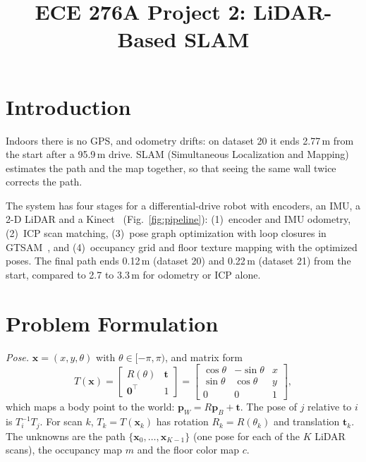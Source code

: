 \documentclass[letterpaper, 10pt, conference]{ieeeconf}
\newcommand{\p}{\mathbf{p}}
\newcommand{\tb}{\mathbf{t}}
\newcommand{\x}{\mathbf{x}}
\begin{document}
\title{ECE 276A Project 2: LiDAR-Based SLAM}

\author{
}

\maketitle
\thispagestyle{empty}
\pagestyle{empty}

\section{Introduction}

Indoors there is no GPS, and odometry drifts: on dataset 20 it ends 2.77\,m
from the start after a 95.9\,m drive. SLAM (Simultaneous Localization and
Mapping) estimates the path and the map together, so that seeing the same
wall twice corrects the path.

The system has four stages for a differential-drive robot with encoders, an
IMU, a 2-D LiDAR and a Kinect~\cite{atanasov} (Fig.~\ref{fig:pipeline}):
(1)~encoder and IMU odometry, (2)~ICP scan matching, (3)~pose graph
optimization with loop closures in GTSAM~\cite{gtsam}, and (4)~occupancy grid
and floor texture mapping with the optimized poses. The final path ends
0.12\,m (dataset 20) and 0.22\,m (dataset 21) from the start, compared to 2.7
to 3.3\,m for odometry or ICP alone.

\section{Problem Formulation}

\emph{Pose.} $\x=(x,y,\theta)$ with $\theta\in[-\pi,\pi)$, and matrix form
\begin{equation}
T(\x)=\begin{bmatrix}R(\theta) & \tb\\ \mathbf{0}^\top & 1\end{bmatrix}
=\begin{bmatrix}\cos\theta & -\sin\theta & x\\ \sin\theta & \cos\theta & y\\ 0&0&1\end{bmatrix},
\end{equation}
which maps a body point to the world: $\p_W=R\p_B+\tb$. The pose of $j$
relative to $i$ is $T_i^{-1}T_j$. For scan $k$, $T_k=T(\x_k)$ has rotation
$R_k=R(\theta_k)$ and translation $\tb_k$. The unknowns are the path
$\{\x_0,\dots,\x_{K-1}\}$ (one pose for each of the $K$ LiDAR scans), the occupancy map $m$ and
the floor color map $c$.
\end{document}
